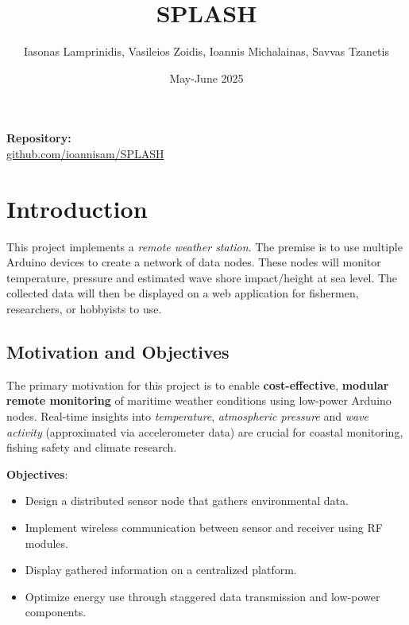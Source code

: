 \documentclass{article}
\title{SPLASH}
\author{Iasonas Lamprinidis, Vasileios Zoidis, Ioannis Michalainas, Savvas Tzanetis}
\date{May-June 2025}
\begin{document}
\maketitle
\begin{center}
  \textbf{Repository:} \\
  \href{https://github.com/ioannisam/SPLASH}{github.com/ioannisam/SPLASH}
\end{center}
\bigskip
\begin{abstract}
\end{abstract}
\tableofcontents
\clearpage

\section{Introduction}
This project implements a \textit{remote weather station}. The premise is to use multiple Arduino devices to create a network of data nodes. These nodes will monitor temperature, pressure and estimated wave shore impact/height at sea level. The collected data will then be displayed on a web application for fishermen, researchers, or hobbyists to use.
    
    \subsection{Motivation and Objectives}

    The primary motivation for this project is to enable \textbf{cost-effective}, \textbf{modular} \textbf{remote monitoring} of maritime weather conditions using low-power Arduino nodes. Real-time insights into \textit{temperature}, \textit{atmospheric pressure} and \textit{wave activity} (approximated via accelerometer data) are crucial for coastal monitoring, fishing safety and climate research.
    
    \vspace{0.5cm}
    \textbf{Objectives}:
    \begin{itemize}
        \item Design a distributed sensor node that gathers environmental data.
        \item Implement wireless communication between sensor and receiver using RF modules.
        \item Display gathered information on a centralized platform.
        \item Optimize energy use through staggered data transmission and low-power components.
    \end{itemize}
    
\end{document}
